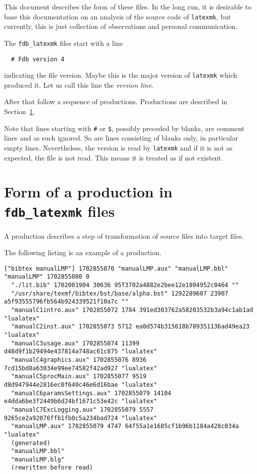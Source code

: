 \documentclass[a4paper, english]{article}%
\newcommand{\latexmk}{\texttt{latexmk}}
\begin{document}
This document describes the form of these files. 
In the long run, it is desirable 
to base this documentation on an analysis of the source code of \latexmk, 
but currently, this is just collection of observations and personal communication. 


The \texttt{fdb\_latexmk} files start with a line 
%
\begin{verbatim}
  # Fdb version 4
\end{verbatim}
%
indicating the file version. 
Maybe this is the major version of \latexmk{} which produced it. 
Let us call this line the \emph{version line}. 

After that follow a sequence of productions. 
Productions are described in Section~\ref{sec:prod}. 

Note that lines starting with \texttt{\#} or \texttt{\$}, 
possibly preceded by blanks, are comment lines and as such ignored. 
So are lines consisting of blanks only, in particular empty lines. 
Nevertheless, the version is read by \texttt{latexmk} 
and if it is not as expected, the file is not read. 
This means it is treated as if not existent. 


\section{Form of a production in \texttt{fdb\_latexmk} files }\label{sec:prod}

A production describes a step of transformation of source files into target files. 

The following listing is an example of a production. 

\begin{lstlisting}[basicstyle=\scriptsize]
["bibtex manualLMP"] 1702855070 "manualLMP.aux" "manualLMP.bbl" "manualLMP" 1702855080 0
  "./lit.bib" 1702001904 30636 95f3702a4882e2bee12e1804952c0464 ""
  "/usr/share/texmf/bibtex/bst/base/alpha.bst" 1292289607 23907 a5f93555796fb564b924339521f10a7c ""
  "manualC1intro.aux" 1702855072 1784 391ed303762a58203532b3a94c1ab1ad "lualatex"
  "manualC2inst.aux" 1702855073 5712 ea0d574b315618b789351136ad49ea23 "lualatex"
  "manualC3usage.aux" 1702855074 11399 d48d9f1b29494e437814a748ac61c875 "lualatex"
  "manualC4graphics.aux" 1702855076 8936 7cd15bd8a63034e99ee74582f42ad927 "lualatex"
  "manualC5procMain.aux" 1702855077 9519 d8d947944e2816ec0f640c46e6d16bae "lualatex"
  "manualC6paramsSettings.aux" 1702855079 14104 e4dda6be3f2449b6d24bf1671c53e42c "lualatex"
  "manualC7ExcLogging.aux" 1702855079 5557 9265ce2a92076ffb1fb0c5a234bad724 "lualatex"
  "manualLMP.aux" 1702855079 4747 64f55a1e1685cf1b96b1184a428c034a "lualatex"
  (generated)
  "manualLMP.bbl"
  "manualLMP.blg"
  (rewritten before read)
\end{lstlisting}
\end{document}
